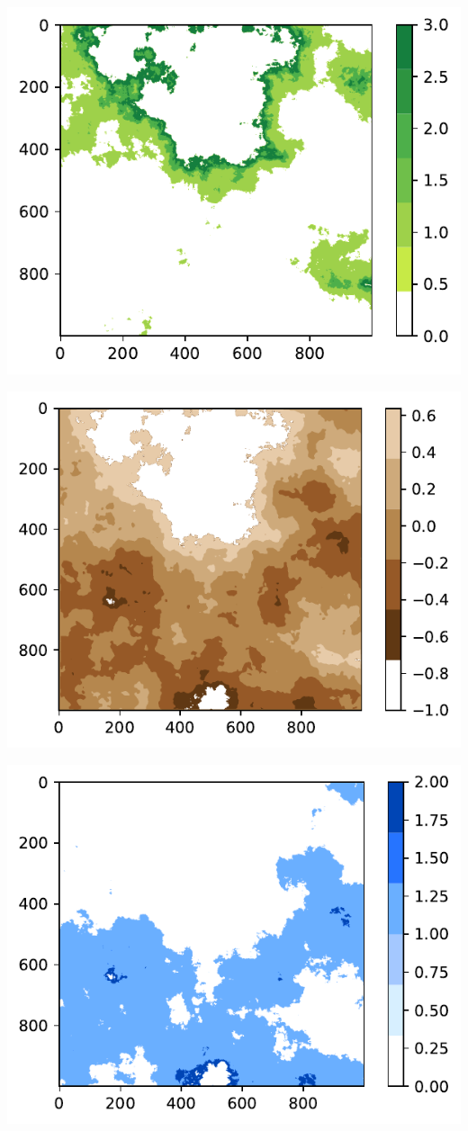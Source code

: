\documentclass[
  letterpaper,
  DIV=11,
  numbers=noendperiod]{scrartcl}
\begin{document}
\includegraphics{MCA_files/figure-pdf/cell-4-output-1.pdf}

\includegraphics{MCA_files/figure-pdf/cell-5-output-1.pdf}

\includegraphics{MCA_files/figure-pdf/cell-6-output-1.pdf}
\end{document}
